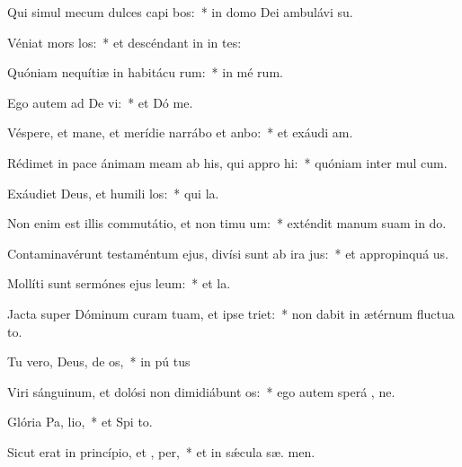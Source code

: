 \item Qui simul mecum dulces capi bos:~* in domo Dei ambulávi  su.
\item Véniat mors  los:~* et descéndant in in tes:
\item Quóniam nequítiæ in habitácu rum:~* in mé rum.
\item Ego autem ad De vi:~* et Dó  me.
\item Véspere, et mane, et merídie narrábo et anbo:~* et exáudi  am.
\item Rédimet in pace ánimam meam ab his, qui appro hi:~* quóniam inter mul  cum.
\item Exáudiet Deus, et humili los:~* qui   la.
\item Non enim est illis commutátio, et non timu um:~* exténdit manum suam in do.
\item Contaminavérunt testaméntum ejus, divísi sunt ab ira  jus:~* et appropinquá  us.
\item Mollíti sunt sermónes ejus  leum:~* et   la.
\item Jacta super Dóminum curam tuam, et ipse  triet:~* non dabit in ætérnum fluctua to.
\item Tu vero, Deus, de os,~* in pú tus
\item Viri sánguinum, et dolósi non dimidiábunt  os:~* ego autem sperá  , ne.
\item Glória Pa,  lio,~* et Spi to.
\item Sicut erat in princípio, et ,  per,~* et in sǽcula sæ. men.
